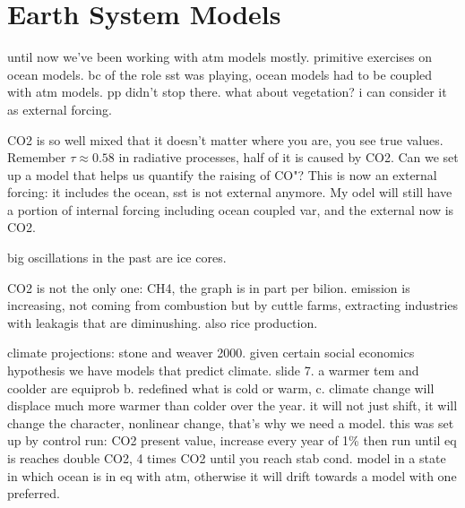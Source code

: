 
\chapter{Earth System Models}%
until now we've been working with atm models mostly. primitive exercises on ocean models. bc of the role sst was playing, ocean models had to be coupled with atm models. pp didn't stop there.
what about vegetation? i can consider it as external forcing.

CO2 is so well mixed that it doesn't matter where you are, you see true values. Remember $\tau\approx 0.58$ in radiative processes, half of it is caused by CO2.  Can we set up a model that helps us quantify the raising of CO"? This is now an external forcing: it includes the ocean, sst is not external anymore. My odel will still have a portion of internal forcing including ocean coupled var, and the external now is CO2.

big oscillations in the past are ice cores.

CO2 is not the only one: CH4, the graph is in part per bilion.  emission is increasing, not coming from combustion but by cuttle farms, extracting industries with leakagis that are diminushing. also rice production.

climate projections: stone and weaver 2000. given certain social economics hypothesis we have models that predict climate. slide 7. a warmer tem and coolder are equiprob b. redefined what is cold or warm, c. climate change will displace much more warmer than colder over the year. it will not just shift, it will change the character, nonlinear change, that's why we need a model.
this was set up by control run: CO2 present value, increase every year of 1\% then run until eq is reaches double CO2, 4 times CO2 until you reach stab cond. model in a state in which ocean is in eq with atm, otherwise it will drift towards a model with one preferred.